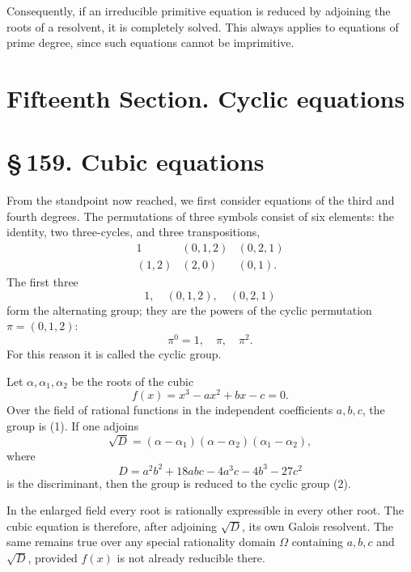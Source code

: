 \documentclass[11pt]{article}
\providecommand{\sect}[2]{\section*{\S\,#1. #2}}
\begin{document}
Consequently, if an irreducible primitive equation is reduced by adjoining the roots of a resolvent, it is completely solved. This always applies to equations of prime degree, since such equations cannot be imprimitive.

\section*{Fifteenth Section. Cyclic equations}

\sect{159}{Cubic equations}

From the standpoint now reached, we first consider equations of the third and fourth degrees. The permutations of three symbols consist of six elements: the identity, two three-cycles, and three transpositions,
\[
\begin{array}{ccc}
        1 & (0,1,2) & (0,2,1)\\[0.25em]
        (1,2) & (2,0) & (0,1).
\end{array}
\tag{1}
\]
The first three
\[
        1,
\quad (0,1,2),
\quad (0,2,1)
\]
form the alternating group; they are the powers of the cyclic permutation $\pi=(0,1,2)$:
\[
        \pi^0=1,
\quad \pi,
\quad \pi^2.
\tag{2}
\]
For this reason it is called the cyclic group.

Let $\alpha,
\alpha_1,
\alpha_2$ be the roots of the cubic
\[
        f(x)=x^3-ax^2+bx-c=0.
\tag{3}
\]
Over the field of rational functions in the independent coefficients $a,b,c$, the group is (1). If one adjoins
\[
        \sqrt D=(\alpha-\alpha_1)(\alpha-\alpha_2)(\alpha_1-\alpha_2),
\tag{4}
\]
where
\[
        D=a^2b^2+18abc-4a^3c-4b^3-27c^2
\tag{5}
\]
is the discriminant, then the group is reduced to the cyclic group (2).

In the enlarged field every root is rationally expressible in every other root. The cubic equation is therefore, after adjoining $\sqrt D$, its own Galois resolvent. The same remains true over any special rationality domain $\Omega$ containing $a,b,c$ and $\sqrt D$, provided $f(x)$ is not already reducible there.
\end{document}
